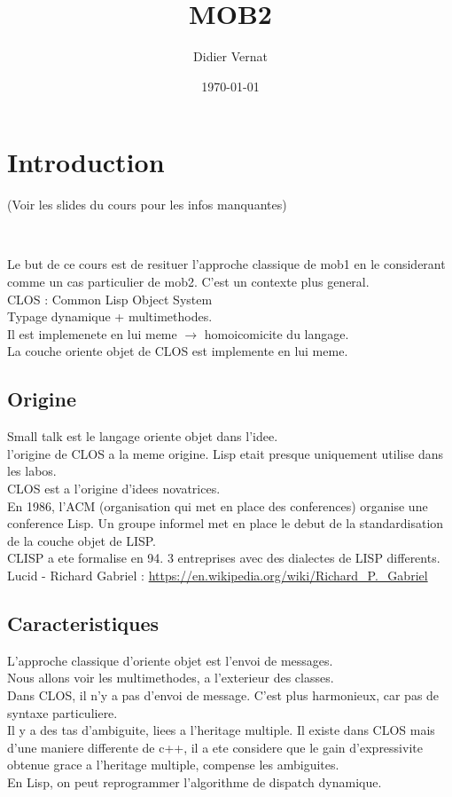 \documentclass[a4paper,11pt]{article}
\title{MOB2}
\author{Didier Vernat}
\date{\today}
\begin{document}
\maketitle
\tableofcontents



\section{Introduction}
(Voir les slides du cours pour les infos manquantes)

\

Le but de ce cours est de resituer l'approche classique de mob1 en le considerant comme un cas particulier de mob2.
C'est un contexte plus general.\\
CLOS : Common Lisp Object System\\
Typage dynamique + multimethodes.\\
Il est implemenete en lui meme $\rightarrow$ homoicomicite du langage.\\
La couche oriente objet de CLOS est implemente en lui meme.\\


\subsection{Origine}
Small talk est le langage oriente objet dans l'idee.\\
l'origine de CLOS a la meme origine. Lisp etait presque uniquement utilise dans les labos.\\
CLOS est a l'origine d'idees novatrices.\\

En 1986, l'ACM (organisation qui met en place des conferences) organise une conference Lisp. Un groupe informel met en place le debut de la standardisation  de la couche objet de LISP.\\
CLISP a ete formalise en 94. 3 entreprises avec des dialectes de LISP differents.\\
Lucid - Richard Gabriel : \url{https://en.wikipedia.org/wiki/Richard_P._Gabriel}\\
\subsection{Caracteristiques}
L'approche classique d'oriente objet est l'envoi de messages.\\
Nous allons voir les multimethodes, a l'exterieur des classes.\\
Dans CLOS, il n'y a pas d'envoi de message. C'est plus harmonieux, car pas de syntaxe particuliere.\\
Il y a des tas d'ambiguite, liees a l'heritage multiple. Il existe dans CLOS mais d'une maniere differente de c++, il a ete considere que le gain d'expressivite obtenue grace a l'heritage multiple, compense les ambiguites.\\
En Lisp, on peut reprogrammer l'algorithme de dispatch dynamique.\\
\end{document}
